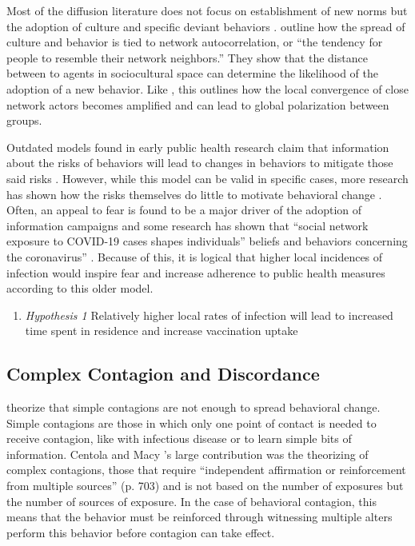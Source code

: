 Most of the diffusion literature does not focus on establishment of new norms
but the adoption of culture and specific deviant behaviors 
\citep[see][for an exception]{centolaSpontaneousEmergenceConventions2015}. 
\citet{dellapostaWhyLiberalsDrink2015} outline how the spread of culture
and behavior is tied to network autocorrelation, or ``the tendency for people to
resemble their network neighbors.'' They show that the distance between to agents
in sociocultural space can determine the likelihood of the adoption of a new
behavior. Like \citet{axelrodDisseminationCultureModel1997}, this outlines
how the local convergence of close network actors becomes amplified and can
lead to global polarization between groups.

Outdated models found in early public health research claim that information
about the risks of behaviors will lead to changes in behaviors to mitigate those
said risks \citep[e.g.][]{flay_etal80}. However, while this model can be valid in specific
cases, more research has shown how the risks themselves do little to motivate
behavioral change \citep{witte_allen00,wolburg06}. Often, an appeal to fear is
found to be a major driver of the adoption of information campaigns and some
research has shown that ``social network exposure to COVID-19 cases shapes
individuals'' beliefs and behaviors concerning the coronavirus'' \citep{bailey_etal20}. Because of this, it is logical that higher local incidences of
infection would inspire fear and increase adherence to public health measures
according to this older model.

\begin{enumerate}
\def\labelenumi{(\arabic{enumi})}
\tightlist
\item
  \emph{Hypothesis 1} Relatively higher local rates of infection will lead to increased time spent in residence and increase vaccination uptake
\end{enumerate}

\hypertarget{complex-contagion-and-discordance}{%
\subsection{Complex Contagion and Discordance}\label{complex-contagion-and-discordance}}

\citep{centolaComplexContagionsWeakness2007} theorize that simple contagions are not
enough to spread behavioral change. Simple contagions are those in which only
one point of contact is needed to receive contagion, like with infectious
disease or to learn simple bits of information.
Centola and Macy \citeyearpar{centolaComplexContagionsWeakness2007}'s large contribution
was the theorizing of complex contagions, those that require ``independent affirmation or
reinforcement from multiple sources'' (p. 703) and is not based on the number of
exposures but the number of sources of exposure. In the case of behavioral
contagion, this means that the behavior must be reinforced through witnessing
multiple alters perform this behavior before contagion can take effect.

